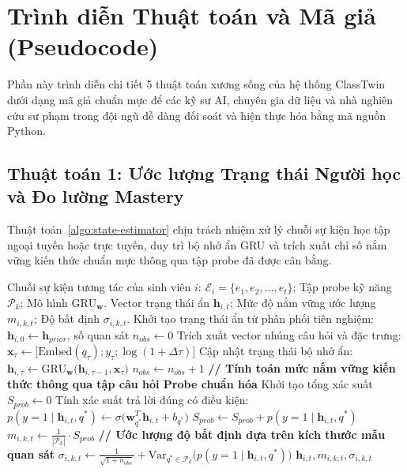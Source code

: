 \section{Trình diễn Thuật toán và Mã giả (Pseudocode)}\label{sec:thuat-toan}

Phần này trình diễn chi tiết 5 thuật toán xương sống của hệ thống ClassTwin dưới dạng mã giả chuẩn mực để các kỹ sư AI, chuyên gia dữ liệu và nhà nghiên cứu sư phạm trong đội ngũ dễ dàng đối soát và hiện thực hóa bằng mã nguồn Python.

\subsection{Thuật toán 1: Ước lượng Trạng thái Người học và Đo lường Mastery}\label{subsec:algo-estimator}
Thuật toán~\ref{algo:state-estimator} chịu trách nhiệm xử lý chuỗi sự kiện học tập ngoại tuyến hoặc trực tuyến, duy trì bộ nhớ ẩn GRU và trích xuất chỉ số nắm vững kiến thức chuẩn mực thông qua tập probe đã được cân bằng.

\begin{algorithm}[H]
\caption{Ước lượng Trạng thái Người học \& Đo lường Probe Mastery}\label{algo:state-estimator}
\begin{algorithmic}[1]
\Require Chuỗi sự kiện tương tác của sinh viên $i$: $\mathcal{E}_i = \{e_1, e_2, \dots, e_t\}$; Tập probe kỹ năng $\mathcal{P}_k$; Mô hình $\text{GRU}_{\mathbf{w}}$.
\Ensure Vector trạng thái ẩn $\mathbf{h}_{i, t}$; Mức độ nắm vững ước lượng $m_{i, k, t}$; Độ bất định $\sigma_{i, k, t}$.
\State Khởi tạo trạng thái ẩn từ phân phối tiên nghiệm: $\mathbf{h}_{i, 0} \leftarrow \mathbf{h}_{prior}$, số quan sát $n_{obs} \leftarrow 0$
    \State Trích xuất vector nhúng câu hỏi và đặc trưng: $\mathbf{x}_\tau \leftarrow \big[ \text{Embed}(q_\tau); y_\tau; \log(1 + \Delta \tau) \big]$
    \State Cập nhật trạng thái bộ nhớ ẩn: $\mathbf{h}_{i, \tau} \leftarrow \text{GRU}_{\mathbf{w}}\big(\mathbf{h}_{i, \tau-1}, \mathbf{x}_\tau\big)$
    \State $n_{obs} \leftarrow n_{obs} + 1$
\EndFor
\State \textbf{// Tính toán mức nắm vững kiến thức thông qua tập câu hỏi Probe chuẩn hóa}
\State Khởi tạo tổng xác suất $S_{prob} \leftarrow 0$
    \State Tính xác suất trả lời đúng có điều kiện:
    \State $p(y=1 \mid \mathbf{h}_{i, t}, q^*) \leftarrow \sigma\big(\mathbf{w}_{q^*}^T \mathbf{h}_{i, t} + b_{q^*}\big)$
    \State $S_{prob} \leftarrow S_{prob} + p(y=1 \mid \mathbf{h}_{i, t}, q^*)$
\EndFor
\State $m_{i, k, t} \leftarrow \frac{1}{|\mathcal{P}_k|} \cdot S_{prob}$
\State \textbf{// Ước lượng độ bất định dựa trên kích thước mẫu quan sát}
\State $\sigma_{i, k, t} \leftarrow \frac{1}{\sqrt{1 + n_{obs}}} + \text{Var}_{q^* \in \mathcal{P}_k}\big(p(y=1 \mid \mathbf{h}_{i, t}, q^*)\big)$
\State \Return $\mathbf{h}_{i, t}, m_{i, k, t}, \sigma_{i, k, t}$
\end{algorithmic}
\end{algorithm}

